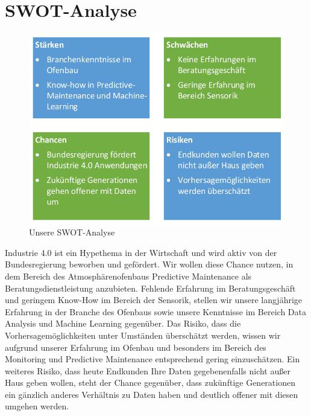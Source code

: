 \section{SWOT-Analyse}

\begin{figure}[H]
\centering
\includegraphics[width=0.7\linewidth]{Bilder/SWOT}
\caption{Unsere SWOT-Analyse}
\label{fig:SWOT}
\end{figure}


Industrie 4.0 ist ein Hypethema in der Wirtschaft und wird aktiv von der Bundesregierung beworben und gefördert. Wir wollen diese Chance nutzen, in dem Bereich des Atmosphärenofenbaus Predictive Maintenance als Beratungsdienstleistung anzubieten. Fehlende Erfahrung im Beratungsgeschäft und geringem Know-How im Bereich der Sensorik, stellen wir unsere langjährige Erfahrung in der Branche des Ofenbaus sowie unsere Kenntnisse im Bereich Data Analysis und Machine Learning gegenüber. Das Risiko, dass die Vorhersagemöglichkeiten unter Umständen überschätzt werden, wissen wir aufgrund unserer Erfahrung im Ofenbau und besonders im Bereich des Monitoring und Predictive Maintenance entsprechend gering einzuschätzen. Ein weiteres Risiko, dass heute Endkunden Ihre Daten gegebenenfalls nicht außer Haus geben wollen, steht der Chance gegenüber, dass zukünftige Generationen ein gänzlich anderes Verhältnis zu Daten haben und deutlich offener mit diesen umgehen werden.

